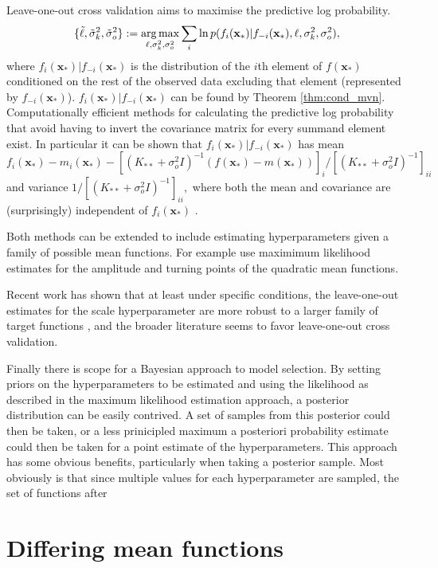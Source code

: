 Leave-one-out cross validation aims to maximise the predictive log
probability.
$$
    \{\tilde{\ell}, \tilde{\sigma}^2_k, \tilde{\sigma}^2_o\}
    := \operatorname*{arg\,max}_{\ell, \sigma^2_k, \sigma^2_o} \sum_{i}
    \ln p(f_i(\mathbf{x}_*) | f_{-i}(\mathbf{x}_*), \ell, \sigma^2_k, \sigma^2_o),
$$ where $f_i(\mathbf{x}_*) | f_{-i}(\mathbf{x}_*)$ is the distribution of the
$i$th element of $f(\mathbf{x}_*)$ conditioned on the rest of the
observed data excluding that element (represented by $f_{-i}(\mathbf{x}_*)$).
$f_i(\mathbf{x}_*) | f_{-i}(\mathbf{x}_*)$ can be found by
Theorem \ref{thm:cond_mvn}. Computationally efficient methods for calculating
the predictive log probability that avoid having to invert the covariance
matrix for every summand element exist. In particular it can be shown that
$f_i(\mathbf{x}_*) | f_{-i}(\mathbf{x}_*)$ has mean
$$
    f_i(\mathbf{x}_*) - m_i(\mathbf{x}_*)
    - [(K_{**} + \sigma^2_o I)^{-1}(f(\mathbf{x}_*) - m(\mathbf{x}_*))]_i
    /[(K_{**} + \sigma^2_o I)^{-1}]_{ii}
$$
and variance $1/[(K_{**} + \sigma^2_o I)^{-1}]_{ii},$ where both the mean and
covariance are (surprisingly) independent of $f_i(\mathbf{x}_*)$
\parencite{rasmussen_gaussian_2008}.

Both methods can be extended to include estimating hyperparameters given a family
of possible mean functions. For example \cite{gutmann_bayesian_2016} use
maximimum likelihood estimates for the amplitude and turning points of the
quadratic mean functions.

Recent work has shown that at least under specific conditions, the
leave-one-out estimates for the scale hyperparameter are more robust to a larger
family of target functions \parencite{naslidnyk_comparing_2024}, and the
broader literature seems to favor leave-one-out cross validation.

Finally there is scope for a Bayesian approach to model selection. By setting
priors on the hyperparameters to be estimated and using the likelihood as described
in the maximum likelihood estimation approach, a posterior distribution can be
easily contrived. A set of samples from this posterior could then be taken, or
a less prinicipled maximum a posteriori probability
estimate could then be taken for a point estimate of the hyperparameters. This
approach has some obvious benefits, particularly when taking a posterior
sample. Most obviously is that since multiple values for each hyperparameter are
sampled, the set of functions after

\section{Differing mean functions}

